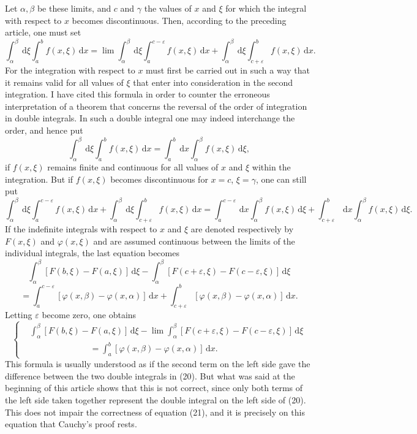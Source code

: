 \documentclass[11pt]{article}
\newcommand{\dd}{\,\mathrm d}
\begin{document}
Let $\alpha,\beta$ be these limits, and $c$ and $\gamma$ the values of $x$ and $\xi$ for which the integral with respect to $x$ becomes discontinuous. Then, according to the preceding article, one must set
\begin{equation}
\int_\alpha^\beta \dd\xi\int_a^b f(x,\xi)\dd x=
\lim\int_\alpha^\beta\dd\xi\int_a^{c-\varepsilon} f(x,\xi)\dd x+
\int_\alpha^\beta\dd\xi\int_{c+\varepsilon}^b f(x,\xi)\dd x.
\tag{19}
\end{equation}
For the integration with respect to $x$ must first be carried out in such a way that it remains valid for all values of $\xi$ that enter into consideration in the second integration. I have cited this formula in order to counter the erroneous interpretation of a theorem that concerns the reversal of the order of integration in double integrals. In such a double integral one may indeed interchange the order, and hence put
\begin{equation}
\int_\alpha^\beta \dd\xi\int_a^b f(x,\xi)\dd x=
\int_a^b \dd x\int_\alpha^\beta f(x,\xi)\dd\xi,
\tag{20}
\end{equation}
if $f(x,\xi)$ remains finite and continuous for all values of $x$ and $\xi$ within the integration. But if $f(x,\xi)$ becomes discontinuous for $x=c$, $\xi=\gamma$, one can still put
\[
\int_\alpha^\beta\dd\xi\int_a^{c-\varepsilon}f(x,\xi)\dd x
+\int_\alpha^\beta\dd\xi\int_{c+\varepsilon}^b f(x,\xi)\dd x
=\int_a^{c-\varepsilon}\dd x\int_\alpha^\beta f(x,\xi)\dd\xi
+\int_{c+\varepsilon}^b\dd x\int_\alpha^\beta f(x,\xi)\dd\xi.
\]
If the indefinite integrals with respect to $x$ and $\xi$ are denoted respectively by $F(x,\xi)$ and $\varphi(x,\xi)$ and are assumed continuous between the limits of the individual integrals, the last equation becomes
\[
\int_\alpha^\beta [F(b,\xi)-F(a,\xi)]\dd\xi-
\int_\alpha^\beta [F(c+\varepsilon,\xi)-F(c-\varepsilon,\xi)]\dd\xi
\]
\[
=\int_a^{c-\varepsilon}[\varphi(x,\beta)-\varphi(x,\alpha)]\dd x
+\int_{c+\varepsilon}^b[\varphi(x,\beta)-\varphi(x,\alpha)]\dd x.
\]
Letting $\varepsilon$ become zero, one obtains
\begin{equation}
\left\{
\begin{aligned}
&\int_\alpha^\beta [F(b,\xi)-F(a,\xi)]\dd\xi
-\lim\int_\alpha^\beta [F(c+\varepsilon,\xi)-F(c-\varepsilon,\xi)]\dd\xi \\
&\hspace{7em}=\int_a^b[\varphi(x,\beta)-\varphi(x,\alpha)]\dd x .
\end{aligned}
\right.
\tag{21}
\end{equation}
This formula is usually understood as if the second term on the left side gave the difference between the two double integrals in (20). But what was said at the beginning of this article shows that this is not correct, since only both terms of the left side taken together represent the double integral on the left side of (20). This does not impair the correctness of equation (21), and it is precisely on this equation that Cauchy's proof rests.
\end{document}
